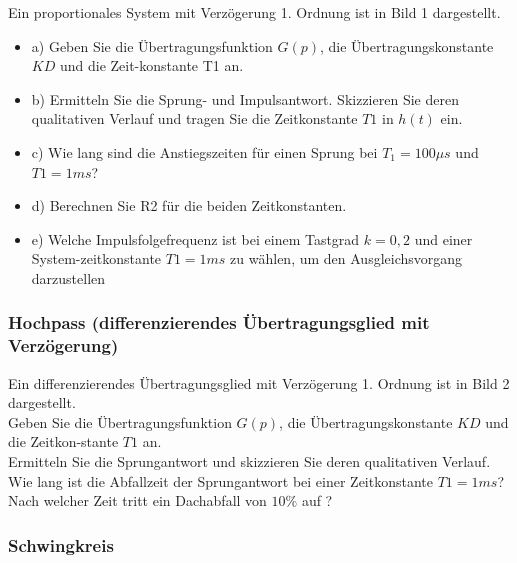 Ein proportionales System mit Verzögerung 1. Ordnung ist in Bild 1 dargestellt.\\
\begin{itemize}
\item a)    Geben  Sie  die  Übertragungsfunktion  $G(p)$,  die  Übertragungskonstante  $KD$ und die Zeit-konstante T1 an.\\ 
\newline%
\item b)    Ermitteln  Sie  die  Sprung-  und  Impulsantwort. Skizzieren  Sie  deren  qualitativen  Verlauf und tragen Sie die Zeitkonstante $T1$ in $h(t)$ ein.\\ 
\newline%
\item c)    Wie lang sind die Anstiegszeiten für einen Sprung bei $T_{ 1 }=100\mu s$ und $T1 = 1 ms$?\\ 
\newline%
\item d)    Berechnen Sie R2 für die beiden Zeitkonstanten.\\ 
\newline%
\item e)    Welche Impulsfolgefrequenz ist bei einem Tastgrad $k = 0,2$ und einer System-zeitkonstante $T1 = 1 ms$ zu wählen, um den Ausgleichsvorgang darzustellen\\
\newline%
\end{itemize}

\subsubsection{Hochpass (differenzierendes Übertragungsglied mit Verzögerung)}

Ein differenzierendes Übertragungsglied mit Verzögerung 1. Ordnung ist in Bild 2 dargestellt.\\
Geben  Sie  die  Übertragungsfunktion $G(p)$,  die  Übertragungskonstante  $KD$ und die Zeitkon-stante $T1$ an.\\ 
Ermitteln Sie die Sprungantwort und skizzieren Sie deren qualitativen Verlauf.\\ 
Wie lang ist die Abfallzeit der Sprungantwort bei einer Zeitkonstante $T1 = 1 ms$?\\
\newline
Nach welcher Zeit tritt ein Dachabfall von $10\%$ auf ?\\

\subsubsection{Schwingkreis}

